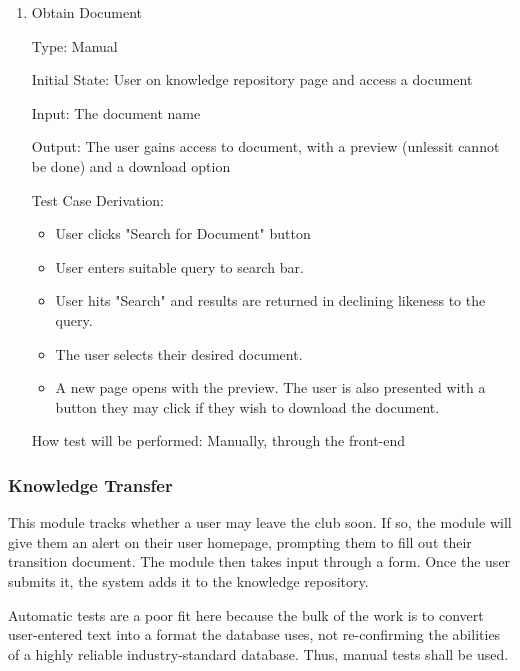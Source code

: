 \documentclass[12pt, titlepage]{article}
\begin{document}
\begin{enumerate}
How test will be performed: Manually, through the front end. 

\item{Obtain Document}

Type: Manual
					
Initial State: User on knowledge repository page and access a document
					
Input: The document name
					
Output: The user gains access to document, with a preview (unlessit cannot be done) and a download option

Test Case Derivation: 

\begin{itemize}
  \item User clicks "Search for Document" button
  \item User enters suitable query to search bar.
  \item User hits "Search" and results are returned in declining likeness to the query.
  \item The user selects their desired document. 
  \item A new page opens with the preview. The user is also presented with a button they may click if they wish to download the document.
\end{itemize}

How test will be performed: Manually, through the front-end
    
\end{enumerate}

\subsubsection{Knowledge Transfer}

This module tracks whether a user may leave the club soon. If so, the module will give them an alert
on their user homepage, prompting them to fill out their transition document. The module then takes input
through a form. Once the user submits it, the system adds it to the knowledge repository.

Automatic tests are a poor fit here because the bulk of the work is to convert user-entered text into a format the 
database uses, not re-confirming the abilities of a highly reliable industry-standard database. Thus, manual
tests shall be used.
\end{document}
